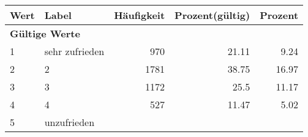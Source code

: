      \begin{longtable}{lXrrr}
     \toprule
     \textbf{Wert} & \textbf{Label} & \textbf{Häufigkeit} & \textbf{Prozent(gültig)} & \textbf{Prozent} \\
     \endhead
     \midrule
     \multicolumn{5}{l}{\textbf{Gültige Werte}}\\

     1 &
     \multicolumn{1}{X}{ sehr zufrieden   } &


       \num{970} &
       \num[round-mode=places,round-precision=2]{21,11} &
         \num[round-mode=places,round-precision=2]{9,24} \\

     2 &
     \multicolumn{1}{X}{ 2   } &


       \num{1781} &
       \num[round-mode=places,round-precision=2]{38,75} &
         \num[round-mode=places,round-precision=2]{16,97} \\

     3 &
     \multicolumn{1}{X}{ 3   } &


       \num{1172} &
       \num[round-mode=places,round-precision=2]{25,5} &
         \num[round-mode=places,round-precision=2]{11,17} \\

     4 &
     \multicolumn{1}{X}{ 4   } &


       \num{527} &
       \num[round-mode=places,round-precision=2]{11,47} &
         \num[round-mode=places,round-precision=2]{5,02} \\

     5 &
     \multicolumn{1}{X}{ unzufrieden   } &



\end{longtable}

